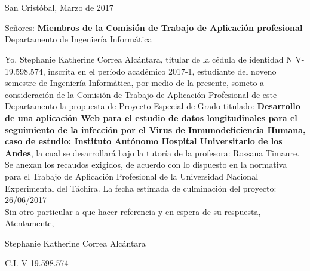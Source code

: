 \chapter*{}
\pagestyle{empty}
\thispagestyle{empty}
\begin{flushright}
\vspace*{-4cm}
San Crist\'obal, Marzo de 2017
\end{flushright}

\vspace*{1cm}
\begin{flushleft}
Se\~nores:
\textbf{Miembros de la Comisi\'on de Trabajo de Aplicaci\'on profesional}
Departamento de Ingenier\'ia Inform\'atica
\end{flushleft}

\vspace*{1cm}

	Yo, Stephanie Katherine Correa Alc\'antara, titular de la c\'edula de identidad N V-19.598.574, inscrita en el per\'iodo acad\'emico 2017-1, estudiante del noveno semestre de Ingenier\'ia Inform\'atica, por medio de la presente, someto a consideraci\'on de la Comisi\'on de Trabajo de Aplicaci\'on Profesional de este Departamento la propuesta de Proyecto Especial de Grado titulado: \textbf{Desarrollo de una aplicaci\'on Web para el estudio de datos longitudinales para el seguimiento de la infecci\'on por el Virus de Inmunodeficiencia Humana, caso de estudio: Instituto Aut\'onomo Hospital Universitario de los Andes}, la cual se desarrollar\'a bajo la tutor\'ia de la profesora: Rossana Timaure.\\
	
	
	Se anexan los recaudos exigidos, de acuerdo con lo dispuesto en la normativa para el Trabajo de Aplicaci\'on Profesional de la Universidad Nacional Experimental del T\'achira. La fecha estimada de culminaci\'on del  proyecto: 26/06/2017
	\\
	
	Sin otro particular a que hacer referencia y en espera de su respuesta,\\
	
	
	Atentamente,\\
	
	\vspace*{2cm}
	
	\begin{center}
	
	Stephanie Katherine Correa Alc\'antara
	
	C.I. V-19.598.574
	\end{center}
	 